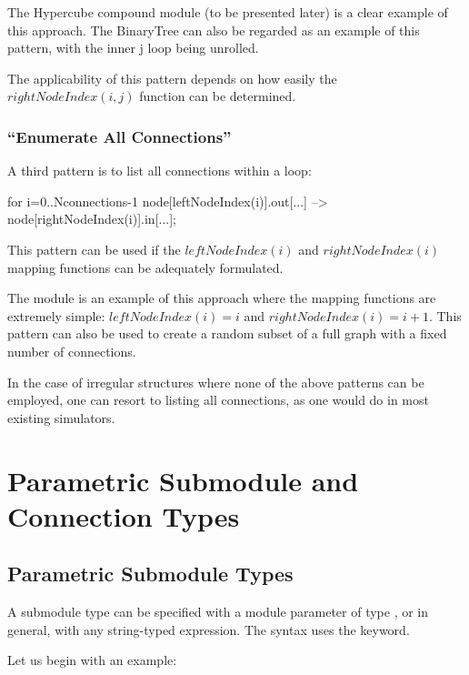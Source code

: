 The Hypercube compound module (to be
presented later) is a clear example of this approach. The BinaryTree can
also be regarded as an example of this pattern, with the inner j loop
being unrolled.

The applicability of this pattern depends on how easily the $rightNodeIndex(i,j)$
function can be determined.


\subsubsection{``Enumerate All Connections''}
\label{sec:ned-lang:enumerate-all-connections}


A third pattern is to list all connections within a loop:

\begin{ned}
for i=0..Nconnections-1 {
    node[leftNodeIndex(i)].out[...] --> node[rightNodeIndex(i)].in[...];
}
\end{ned}

This pattern can be used if the $leftNodeIndex(i)$ and $rightNodeIndex(i)$
mapping functions can be adequately formulated.

The  module is an example of this approach where the mapping
functions are extremely simple: $leftNodeIndex(i)=i$ and $rightNodeIndex(i) = i+1$.
This pattern can also be used to create a random subset of a full
graph with a fixed number of connections.

In the case of irregular structures where none of the above patterns
can be employed, one can resort to listing all connections, as one
would do in most existing simulators.



\section{Parametric Submodule and Connection Types}
\label{sec:ned-lang:parametric-submodule-and-connection-types}

\subsection{Parametric Submodule Types}
\label{sec:ned-lang:submodule-like}

A submodule type can be specified with a module parameter of type
, or in general, with any string-typed expression. The syntax
uses the  keyword.

Let us begin with an example:

